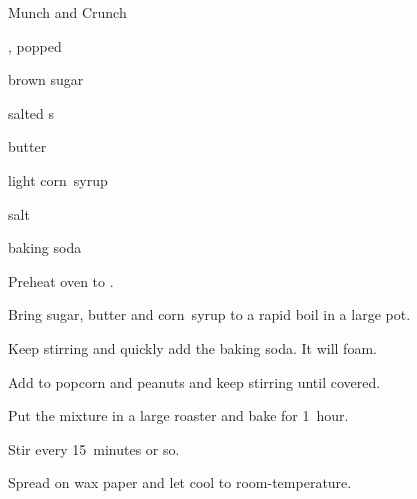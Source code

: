 \begin{recipe}{Munch and Crunch}{}{}

\begin{ingredients}
\item {} , popped
\item {} brown sugar
\item \C{1\half} salted s
\item {} butter
\item \C{\half} light corn~syrup
\item {} salt
\item \tp{\half} baking soda
\end{ingredients}

\begin{directions}
\item Preheat oven to .
\item Bring sugar, butter and corn~syrup to a rapid boil in a large pot.
\item Keep stirring and quickly add the baking soda. It will foam.
\item Add to popcorn and peanuts and keep stirring until covered.
\item Put the mixture in a large roaster and bake for 1~hour.
\item Stir every 15~minutes or so.
\item Spread on wax paper and let cool to room-temperature.
\end{directions}
\end{recipe}
